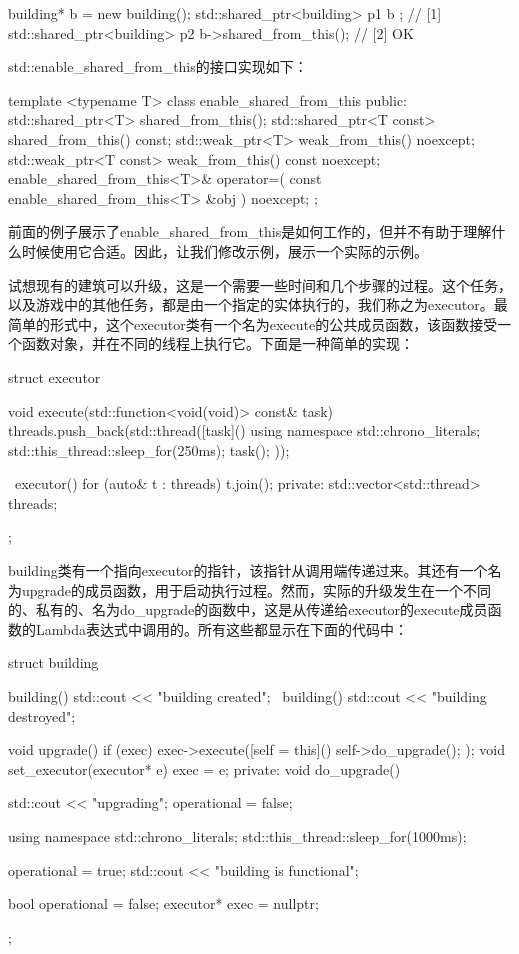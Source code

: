 \begin{cpp}
building* b = new building();
std::shared_ptr<building> p1{ b }; // [1]
std::shared_ptr<building> p2{
	b->shared_from_this()}; // [2] OK
\end{cpp}

std::enable\_shared\_from\_this的接口实现如下：

\begin{cpp}
template <typename T>
class enable_shared_from_this
{
	public:
	std::shared_ptr<T> shared_from_this();
	std::shared_ptr<T const> shared_from_this() const;
	std::weak_ptr<T> weak_from_this() noexcept;
	std::weak_ptr<T const> weak_from_this() const noexcept;
	enable_shared_from_this<T>& operator=(
		const enable_shared_from_this<T> &obj ) noexcept;
};
\end{cpp}

前面的例子展示了enable\_shared\_from\_this是如何工作的，但并不有助于理解什么时候使用它合适。因此，让我们修改示例，展示一个实际的示例。

试想现有的建筑可以升级，这是一个需要一些时间和几个步骤的过程。这个任务，以及游戏中的其他任务，都是由一个指定的实体执行的，我们称之为executor。最简单的形式中，这个executor类有一个名为execute的公共成员函数，该函数接受一个函数对象，并在不同的线程上执行它。下面是一种简单的实现：

\begin{cpp}
struct executor
{
	void execute(std::function<void(void)> const& task)
	{
		threads.push_back(std::thread([task]() {
			using namespace std::chrono_literals;
			std::this_thread::sleep_for(250ms);
			task();
		}));
	}

	~executor()
	{
		for (auto& t : threads)
		t.join();
	}
private:
	std::vector<std::thread> threads;
};
\end{cpp}

building类有一个指向executor的指针，该指针从调用端传递过来。其还有一个名为upgrade的成员函数，用于启动执行过程。然而，实际的升级发生在一个不同的、私有的、名为do\_upgrade的函数中，这是从传递给executor的execute成员函数的Lambda表达式中调用的。所有这些都显示在下面的代码中：

\begin{cpp}
struct building
{
	building() { std::cout << "building created\n"; }
	~building() { std::cout << "building destroyed\n"; }
	
	void upgrade()
	{
		if (exec)
		{
			exec->execute([self = this]() {
				self->do_upgrade();
			});
		}
	}
	void set_executor(executor* e) { exec = e; }
private:
	void do_upgrade()
	{
		std::cout << "upgrading\n";
		operational = false;
		
		using namespace std::chrono_literals;
		std::this_thread::sleep_for(1000ms);
		
		operational = true;
		std::cout << "building is functional\n";
	}

	bool operational = false;
	executor* exec = nullptr;
};
\end{cpp}

